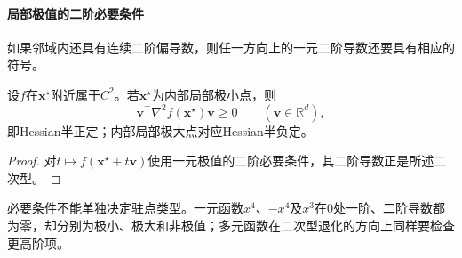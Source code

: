 \paragraph{局部极值的二阶必要条件}
如果邻域内还具有连续二阶偏导数，则任一方向上的一元二阶导数还要具有相应的符号。
\begin{theorem}[局部极值的二阶必要条件]
\label{thm:multivariable-extremum-second-order}
设$f$在$\bm x^\star$附近属于$C^2$。若$\bm x^\star$为内部局部极小点，则
\begin{equation}
 \bm v^\top\nabla^2f(\bm x^\star)\bm v\geq0
 \qquad(\bm v\in\mathbb R^d),
\label{eq:analysis-second-order-necessary}
\end{equation}
即Hessian半正定；内部局部极大点对应Hessian半负定。
\end{theorem}
\begin{proof}
对$t\mapsto f(\bm x^\star+t\bm v)$使用一元极值的二阶必要条件，其二阶导数正是所述二次型。
\end{proof}
必要条件不能单独决定驻点类型。一元函数$x^4$、$-x^4$及$x^3$在$0$处一阶、二阶导数都为零，却分别为极小、极大和非极值；多元函数在二次型退化的方向上同样要检查更高阶项。

